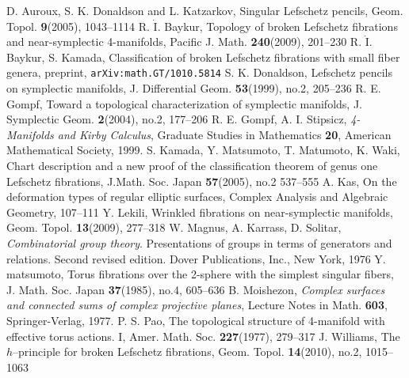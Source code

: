 \documentclass{amsart}
\theoremstyle{plain}
\theoremstyle{definition}
\begin{document}
\begin{thebibliography}{99}

 D. Auroux, S. K. Donaldson and L. Katzarkov, Singular Lefschetz pencils, Geom. Topol. \textbf{9}(2005), 1043--1114
 R. $\dot{\text{I}}$. Baykur, Topology of broken Lefschetz fibrations and near-symplectic 4-manifolds, Pacific J. Math. \textbf{240}(2009), 201--230
 R. $\dot{\text{I}}$. Baykur, S. Kamada, Classification of broken Lefschetz fibrations with small fiber genera, preprint, \verb|arXiv:math.GT/1010.5814|
 S. K. Donaldson, Lefschetz pencils on symplectic manifolds, J. Differential Geom. {\bf 53}(1999), no.2, 205--236
 R. E. Gompf, Toward a topological characterization of symplectic manifolds, J. Symplectic Geom. {\bf 2}(2004), no.2, 177--206
 R. E. Gompf, A. I. Stipsicz, {\it 4-Manifolds and Kirby Calculus}, Graduate Studies in Mathematics \textbf{20}, American Mathematical Society, 1999.
 S. Kamada, Y. Matsumoto, T. Matumoto, K. Waki, Chart description and a new proof of the classification theorem of genus one Lefschetz fibrations, J.Math. Soc. Japan \textbf{57}(2005), no.2 537--555
 A. Kas, On the deformation types of regular elliptic surfaces, Complex Analysis and Algebraic Geometry, 107--111
 Y. Lekili, Wrinkled fibrations on near-symplectic manifolds, Geom. Topol. \textbf{13}(2009), 277--318
 W. Magnus, A. Karrass, D. Solitar, {\it Combinatorial group theory}. Presentations of groups in terms of generators and relations. Second revised edition. Dover Publications, Inc., New York, 1976
 Y. matsumoto, Torus fibrations over the 2-sphere with the simplest singular fibers, J. Math. Soc. Japan \textbf{37}(1985), no.4, 605--636
 B. Moishezon, {\it Complex surfaces and connected sums of complex projective planes}, Lecture Notes in Math. {\bf 603}, Springer-Verlag, 1977. 
 P. S. Pao, The topological structure of 4-manifold with effective torus actions. I, Amer. Math. Soc. \textbf{227}(1977), 279--317
 J. Williams, The $h$--principle for broken Lefschetz fibrations, Geom. Topol. \textbf{14}(2010), no.2, 1015--1063

\end{thebibliography}
\end{document}
